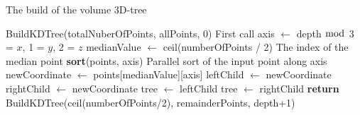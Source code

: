 \begin{algorithm}
\caption{The build of the volume 3D-tree}
\label{volume_kdtree_build}
\begin{algorithmic}
\State BuildKDTree(totalNuberOfPoints, allPoints, 0) \Comment First call
  \State axis $\gets$ depth $\bmod$ 3  = $x$, 1 = $y$, 2 = $z$
  \State medianValue $\gets$ ceil(numberOfPoints / 2) \Comment The index of the median point
  \State \textbf{sort}(points, axis) \Comment Parallel sort of the input point along axis
  \State newCoordinate $\gets$ points[medianValue][axis]
  \State leftChild $\gets$ newCoordinate
  \State rightChild $\gets$ newCoordinate
  \State tree $\gets$ leftChild
  \State tree $\gets$ rightChild
  \State \textbf{return} \small{BuildKDTree(ceil(numberOfPoints/2), remainderPoints, depth+1)}
  \EndIf
\EndProcedure
\end{algorithmic}
\end{algorithm}

